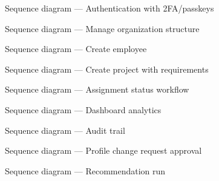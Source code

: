 \documentclass{bts-report}
\begin{document}
\begin{figure}[htbp]
  \centering
  \resizebox{0.98\textwidth}{!}{}
  \caption{Sequence diagram --- Authentication with 2FA/passkeys}
  \label{fig:seq-auth}
\end{figure}

\begin{figure}[htbp]
  \centering
  \resizebox{0.98\textwidth}{!}{}
  \caption{Sequence diagram --- Manage organization structure}
  \label{fig:seq-org}
\end{figure}

\begin{figure}[htbp]
  \centering
  \resizebox{0.98\textwidth}{!}{}
  \caption{Sequence diagram --- Create employee}
  \label{fig:seq-employee}
\end{figure}

\begin{figure}[htbp]
  \centering
  \resizebox{0.98\textwidth}{!}{}
  \caption{Sequence diagram --- Create project with requirements}
  \label{fig:seq-project}
\end{figure}

\begin{figure}[htbp]
  \centering
  \resizebox{0.98\textwidth}{!}{}
  \caption{Sequence diagram --- Assignment status workflow}
  \label{fig:seq-assignment}
\end{figure}

\begin{figure}[htbp]
  \centering
  \resizebox{0.98\textwidth}{!}{}
  \caption{Sequence diagram --- Dashboard analytics}
  \label{fig:seq-dashboard}
\end{figure}

\begin{figure}[htbp]
  \centering
  \resizebox{0.98\textwidth}{!}{}
  \caption{Sequence diagram --- Audit trail}
  \label{fig:seq-audit}
\end{figure}

\begin{figure}[htbp]
  \centering
  \resizebox{0.98\textwidth}{!}{}
  \caption{Sequence diagram --- Profile change request approval}
  \label{fig:seq-portal}
\end{figure}

\begin{figure}[htbp]
  \centering
  \resizebox{0.98\textwidth}{!}{}
  \caption{Sequence diagram --- Recommendation run}
  \label{fig:seq-reco}
\end{figure}
\end{document}
